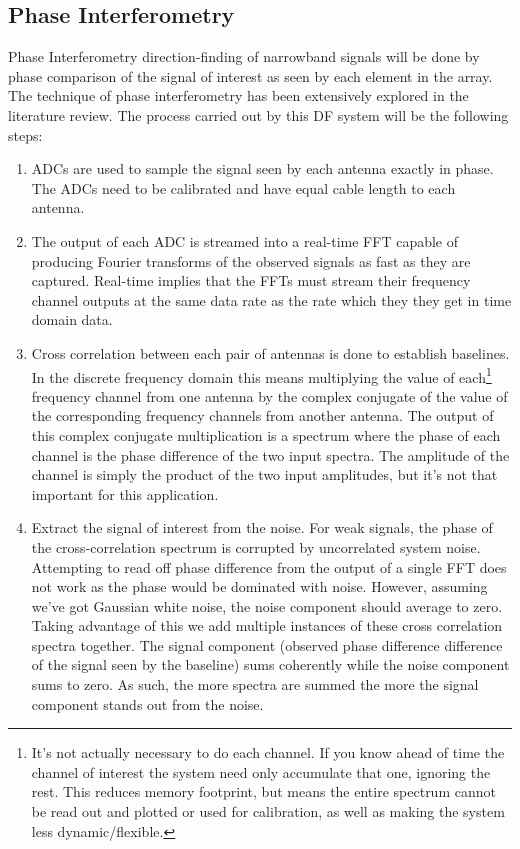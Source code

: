 \subsection{Phase Interferometry}
Phase Interferometry direction-finding of narrowband signals will be done by phase comparison of the signal of interest as seen by each element in the array. The technique of phase interferometry has been extensively explored in the literature review. The process carried out by this DF system will be the following steps:
\begin{enumerate}
  \item ADCs are used to sample the signal seen by each antenna exactly in phase. The ADCs need to be calibrated and have equal cable length to each antenna.
  \item The output of each ADC is streamed into a real-time FFT capable of producing Fourier transforms of the observed signals as fast as they are captured. Real-time implies that the FFTs must stream their frequency channel outputs at the same data rate as the rate which they they get in time domain data.
  \item Cross correlation between each pair of antennas is done to establish baselines. In the discrete frequency domain this means multiplying the value of each\footnote{It's not actually necessary to do each channel. If you know ahead of time the channel of interest the system need only accumulate that one, ignoring the rest. This reduces memory footprint, but means the entire spectrum cannot be read out and plotted or used for calibration, as well as making the system less dynamic/flexible.} frequency channel from one antenna by the complex conjugate of the value of the corresponding frequency channels from another antenna. The output of this complex conjugate multiplication is a spectrum where the phase of each channel is the phase difference of the two input spectra. The amplitude of the channel is simply the product of the two input amplitudes, but it's not that important for this application.
  \item Extract the signal of interest from the noise. For weak signals, the phase of the cross-correlation spectrum is corrupted by uncorrelated system noise. Attempting to read off phase difference from the output of a single FFT does not work as the phase would be dominated with noise. However, assuming we've got Gaussian white noise, the noise component should average to zero. Taking advantage of this we add multiple instances of these cross correlation spectra together. The signal component (observed phase difference difference of the signal seen by the baseline) sums coherently while the noise component sums to zero. As such, the more spectra are summed the more the signal component stands out from the noise.

\end{enumerate}
